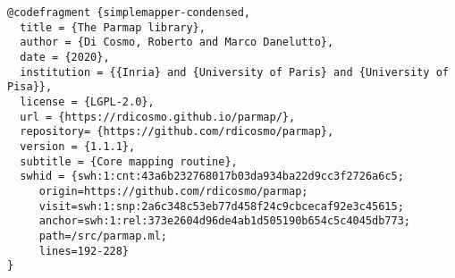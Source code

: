 \begin{verbatim}
@codefragment {simplemapper-condensed,
  title = {The Parmap library},
  author = {Di Cosmo, Roberto and Marco Danelutto},
  date = {2020},
  institution = {{Inria} and {University of Paris} and {University of Pisa}},
  license = {LGPL-2.0},
  url = {https://rdicosmo.github.io/parmap/},
  repository= {https://github.com/rdicosmo/parmap},
  version = {1.1.1},
  subtitle = {Core mapping routine},
  swhid = {swh:1:cnt:43a6b232768017b03da934ba22d9cc3f2726a6c5;
     origin=https://github.com/rdicosmo/parmap;
     visit=swh:1:snp:2a6c348c53eb77d458f24c9cbcecaf92e3c45615;
     anchor=swh:1:rel:373e2604d96de4ab1d505190b654c5c4045db773;
     path=/src/parmap.ml;
     lines=192-228}
}
\end{verbatim}
